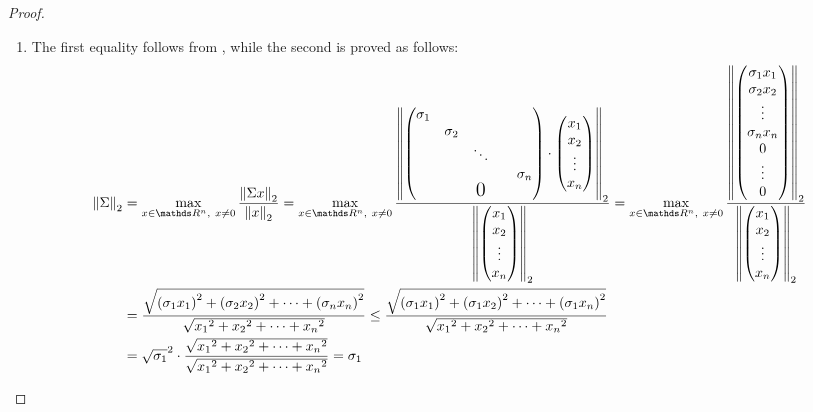 \documentclass[computationalMathematics.tex]{subfiles}
\begin{document}
\begin{proof}
  \begin{enumerate}
    \item The first equality follows from , while the second is proved as follows:
  \begin{equation}
    \begin{split}
      \norm{\Sigma}_2 &=
    \max\limits_{x \in \R^n,~x \neq 0}\frac{\norm{\Sigma x}_2}{\norm{x}_2} =
    \max\limits_{x \in \R^n,~x \neq 0}\frac{\norm{\begin{pmatrix}
    \sigma_1\\
    & \sigma_2\\
    && \ddots\\
    &&&& \sigma_n\\
      &&\text{\Large 0}&&\\
    \end{pmatrix}
    \cdot 
    \begin{pmatrix}
      x_1\\
      x_2\\
      \vdots\\
      x_n\\
    \end{pmatrix}}_2}
      {\norm{\begin{pmatrix}
      x_1\\
      x_2\\
      \vdots\\
      x_n\\
    \end{pmatrix}}_2}
    =
      \max\limits_{x \in \R^n,~x \neq 0}\frac{\norm{\begin{pmatrix}
      \sigma_1 x_1\\
      \sigma_2 x_2\\
      \vdots\\
      \sigma_n x_n\\
      0\\
      \vdots\\
      0\\
      \end{pmatrix}}_2}
      {\norm{\begin{pmatrix}
      x_1\\
      x_2\\
      \vdots\\
      x_n\\
      \end{pmatrix}}_2}\\
      &=
    \frac{\sqrt{{(\sigma_1 x_1)}^2 + {(\sigma_2 x_2)}^2 + \cdots +{(\sigma_n x_n)}^2}}{\sqrt{{x_1}^2 + {x_2}^2 + \cdots +{x_n}^2}}
      \le 
      \frac{\sqrt{{(\sigma_1 x_1)}^2 + {(\sigma_1 x_2)}^2 + \cdots +{(\sigma_1 x_n)}^2}}{\sqrt{{x_1}^2 + {x_2}^2 + \cdots +{x_n}^2}}\\
      &=
    \sqrt{\sigma_1}^2 \cdot \frac{\sqrt{{x_1}^2 + {x_2}^2 + \cdots +{x_n}^2}}{\sqrt{{x_1}^2 + {x_2}^2 + \cdots +{x_n}^2}}
      = \sigma_1
  \end{split}
  \end{equation}


\end{enumerate}
\end{proof}
\end{document}

